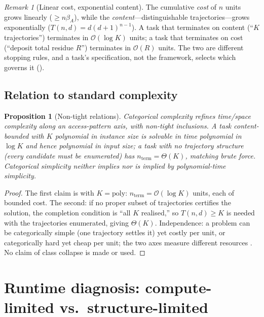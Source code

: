 \documentclass[twocolumn,10pt,a4paper]{article}
\theoremstyle{thmstyle}
\newtheorem{proposition}[theorem]{Proposition}
\theoremstyle{definition}
\theoremstyle{remark}
\newtheorem{remark}[theorem]{Remark}
\newcommand{\floor}{\beta}
\begin{document}
\begin{remark}[Linear cost, exponential content]
\label{rem:asymmetry}
The cumulative \emph{cost} of $n$ units grows linearly ($\ge n\floor_A$),
while the \emph{content}---distinguishable trajectories---grows
exponentially ($T(n,d)=d(d+1)^{n-1}$). A task that terminates on content
(``$K$ trajectories'') terminates in $\mathcal{O}(\log K)$ units; a task
that terminates on cost (``deposit total residue $R$'') terminates in
$\mathcal{O}(R)$ units. The two are different stopping rules, and a task's
specification, not the framework, selects which governs it
().
\end{remark}

\subsection{Relation to standard complexity}
\label{sec:complexity-standard}

\begin{proposition}[Non-tight relations]
\label{prop:standard}
Categorical complexity refines time/space complexity along an
access-pattern axis, with non-tight inclusions. A task content-bounded
with $K$ polynomial in instance size is solvable in time polynomial in
$\log K$ and hence polynomial in input size; a task with no
trajectory structure (every candidate must be enumerated) has
$n_{\mathrm{term}}=\Theta(K)$, matching brute force. Categorical
simplicity neither implies nor is implied by polynomial-time simplicity.
\end{proposition}

\begin{proof}
The first claim is  with $K=\mathrm{poly}$:
$n_{\mathrm{term}}=\mathcal{O}(\log K)$ units, each of bounded cost. The
second: if no proper subset of trajectories certifies the solution, the
completion condition is ``all $K$ realised,'' so $T(n,d)\ge K$ is needed
with the trajectories enumerated, giving $\Theta(K)$. Independence: a
problem can be categorically simple (one trajectory settles it) yet
costly per unit, or categorically hard yet cheap per unit; the two axes
measure different resources \citep{hartmanis1965,arora2009,sipser2013}.
No claim of class collapse is made or used.
\end{proof}

\section{Runtime diagnosis: compute-limited vs.\ structure-limited}
\label{sec:diagnosis}
\end{document}
